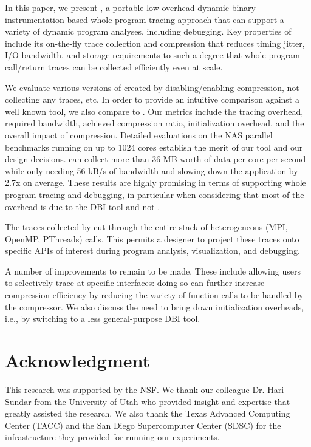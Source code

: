 
In this paper, 
we present \parlot, a portable low overhead dynamic
binary instrumentation-based
whole-program
tracing approach that can support a variety of 
dynamic program analyses, including debugging.
%
Key properties of \parlot include its on-the-fly trace collection and
compression that reduces timing jitter, I/O bandwidth, and storage requirements to such a degree that whole-program call/return traces can be collected efficiently even at scale. 

We evaluate various versions of \parlot
created by disabling/enabling compression, not collecting any traces, etc.
%
In order to provide an intuitive comparison against a well known tool,
we also compare \parlot to \callgrind.
%
Our metrics include the tracing overhead, required bandwidth, achieved compression ratio, initialization overhead, and the 
overall impact of compression.
%
Detailed evaluations on the NAS parallel benchmarks running on
up to 1024 cores establish the merit of our tool and our design decisions. 
\parlot can collect more than 36 MB worth of data per core per second while 
only needing 56 kB/s of bandwidth and slowing down the 
application by 2.7x on average.
%
These results are highly promising in terms of supporting 
whole program tracing and debugging, in particular when considering that most of the overhead is due to the DBI tool and not \parlot.


The traces collected by \parlot cut through the entire stack of heterogeneous
(MPI, OpenMP, PThreads) calls. 
%
This permits a designer to project these traces onto specific
APIs of interest during program analysis, visualization, and debugging.
%


A number of improvements to \parlot remain to be made.
%
These include allowing users to selectively trace at specific
interfaces: doing so can further increase compression efficiency
by reducing the variety of function calls to be handled by
the compressor.
%
We also discuss the need to bring down initialization overheads, i.e.,
by switching to a less general-purpose DBI tool.
%



\section*{Acknowledgment}

This research was supported by the NSF. We thank our colleague Dr. Hari Sundar from the University of Utah who provided insight and expertise that greatly assisted the research. We also thank the Texas Advanced Computing Center (TACC) and the San Diego Supercomputer Center (SDSC) for the infrastructure they provided for running our experiments.

 
